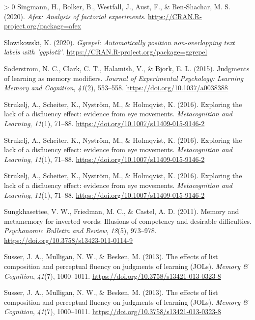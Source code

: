 \documentclass[
  english,
  jou]{apa7}
\newlength{\cslhangindent}
\newenvironment{CSLReferences}[3] %
 {%
  \setlength{\parindent}{0pt}
  \ifodd #1 \everypar{\setlength{\hangindent}{\cslhangindent}}\ignorespaces\fi
  \ifnum #2 > 0
  \setlength{\parskip}{#2\baselineskip}
  \fi
 }%
 {}
\begin{document}
\begin{CSLReferences}{1}{0}
\leavevmode\hypertarget{ref-Singmann2020}{}%
Singmann, H., Bolker, B., Westfall, J., Aust, F., \& Ben-Shachar, M. S. (2020). \emph{Afex: Analysis of factorial experiments}. \url{https://CRAN.R-project.org/package=afex}

\leavevmode\hypertarget{ref-R-ggrepel}{}%
Slowikowski, K. (2020). \emph{Ggrepel: Automatically position non-overlapping text labels with 'ggplot2'}. \url{https://CRAN.R-project.org/package=ggrepel}

\leavevmode\hypertarget{ref-Soderstrom2015}{}%
Soderstrom, N. C., Clark, C. T., Halamish, V., \& Bjork, E. L. (2015). {Judgments of learning as memory modifiers}. \emph{Journal of Experimental Psychology: Learning Memory and Cognition}, \emph{41}(2), 553--558. \url{https://doi.org/10.1037/a0038388}

\leavevmode\hypertarget{ref-Strukelj2016}{}%
Strukelj, A., Scheiter, K., Nyström, M., \& Holmqvist, K. (2016). {Exploring the lack of a disfluency effect: evidence from eye movements}. \emph{Metacognition and Learning}, \emph{11}(1), 71--88. \url{https://doi.org/10.1007/s11409-015-9146-2}

\leavevmode\hypertarget{ref-Strukelj2016}{}%
Strukelj, A., Scheiter, K., Nyström, M., \& Holmqvist, K. (2016). {Exploring the lack of a disfluency effect: evidence from eye movements}. \emph{Metacognition and Learning}, \emph{11}(1), 71--88. \url{https://doi.org/10.1007/s11409-015-9146-2}

\leavevmode\hypertarget{ref-Strukelj2016}{}%
Strukelj, A., Scheiter, K., Nyström, M., \& Holmqvist, K. (2016). {Exploring the lack of a disfluency effect: evidence from eye movements}. \emph{Metacognition and Learning}, \emph{11}(1), 71--88. \url{https://doi.org/10.1007/s11409-015-9146-2}

\leavevmode\hypertarget{ref-Sungkhasettee2011}{}%
Sungkhasettee, V. W., Friedman, M. C., \& Castel, A. D. (2011). {Memory and metamemory for inverted words: Illusions of competency and desirable difficulties}. \emph{Psychonomic Bulletin and Review}, \emph{18}(5), 973--978. \url{https://doi.org/10.3758/s13423-011-0114-9}

\leavevmode\hypertarget{ref-Susser2013}{}%
Susser, J. A., Mulligan, N. W., \& Besken, M. (2013). {The effects of list composition and perceptual fluency on judgments of learning (JOLs)}. \emph{Memory {\&} Cognition}, \emph{41}(7), 1000--1011. \url{https://doi.org/10.3758/s13421-013-0323-8}

\leavevmode\hypertarget{ref-Susser2013}{}%
Susser, J. A., Mulligan, N. W., \& Besken, M. (2013). {The effects of list composition and perceptual fluency on judgments of learning (JOLs)}. \emph{Memory {\&} Cognition}, \emph{41}(7), 1000--1011. \url{https://doi.org/10.3758/s13421-013-0323-8}


\end{CSLReferences}
\end{document}
